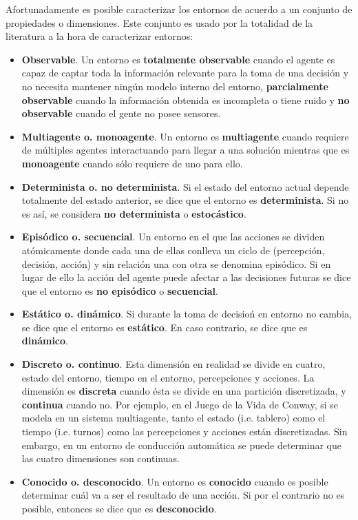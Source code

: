 Afortunadamente es posible caracterizar los entornos de acuerdo a un conjunto de propiedades o dimensiones. Este conjunto es usado por la totalidad de la literatura a la hora de caracterizar entornos:

\begin{itemize}
	\item \textbf{Observable}. Un entorno es \textbf{totalmente observable} cuando el agente es capaz de captar toda la información relevante para la toma de una decisión y no necesita mantener ningún modelo interno del entorno, \textbf{parcialmente observable} cuando la información obtenida es incompleta o tiene ruido y \textbf{no observable} cuando el gente no posee sensores.
	\item \textbf{Multiagente o. monoagente}. Un entorno es \textbf{multiagente} cuando requiere de múltiples agentes interactuando para llegar a una solución mientras que es \textbf{monoagente} cuando sólo requiere de uno para ello.
	\item \textbf{Determinista o. no determinista}. Si el estado del entorno actual depende totalmente del estado anterior, se dice que el entorno es \textbf{determinista}. Si no es así, se considera \textbf{no determinista} o \textbf{estocástico}.
	\item \textbf{Episódico o. secuencial}. Un entorno en el que las acciones se dividen atómicamente donde cada una de ellas conlleva un ciclo de (percepción, decisión, acción) y sin relación una con otra se denomina episódico. Si en lugar de ello la acción del agente puede afectar a las decisiones futuras se dice que el entorno es \textbf{no episódico} o \textbf{secuencial}.
	\item \textbf{Estático o. dinámico}. Si durante la toma de decisioń en entorno no cambia, se dice que el entorno es \textbf{estático}. En caso contrario, se dice que es \textbf{dinámico}.
	\item \textbf{Discreto o. continuo}. Esta dimensión en realidad se divide en cuatro, estado del entorno, tiempo en el entorno, percepciones y acciones. La dimensión es \textbf{discreta} cuando ésta se divide en una partición discretizada, y \textbf{continua} cuando no. Por ejemplo, en el Juego de la Vida de Conway, si se modela en un sistema multiagente, tanto el estado (i.e. tablero) como el tiempo (i.e. turnos) como las percepciones y acciones están discretizadas. Sin embargo, en un entorno de conducción automática se puede determinar que las cuatro dimensiones son continuas.
	\item \textbf{Conocido o. desconocido}. Un entorno es \textbf{conocido} cuando es posible determinar cuál va a ser el resultado de una acción. Si por el contrario no es posible, entonces se dice que es \textbf{desconocido}.
\end{itemize}

